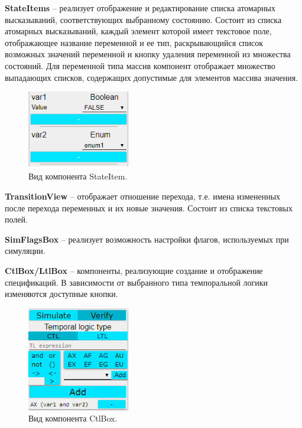\textbf{StateItems} -- реализует отображение и редактирование списка атомарных высказываний, соответствующих выбранному состоянию. Состоит из списка атомарных высказываний, каждый элемент которой имеет текстовое поле, отображающее название переменной и ее тип, раскрывающийся список возможных значений переменной и кнопку удаления переменной из множества состояний. Для переменной типа массив компонент отображает множество выпадающих списков, содержащих допустимые для элементов массива значения.


\begin{figure}[htbp]
	\centering
	\includegraphics[width=0.4\textwidth]{fig/state_item.png}
	\caption{Вид компонента StateItem.}
	\label{fig:state_item}
\end{figure}

\textbf{TransitionView} -- отображает отношение перехода, т.е. имена измененных после перехода переменных и их новые значения. Состоит из списка текстовых полей.

\textbf{SimFlagsBox} -- реализует возможность настройки флагов, используемых при симуляции.

\textbf{CtlBox/LtlBox} -- компоненты, реализующие создание и отображение спецификаций. В зависимости от выбранного типа темпоральной логики изменяются доступные кнопки.

\begin{figure}[htbp]
	\centering
	\includegraphics[width=0.4\textwidth]{fig/tl_box.png}
	\caption{Вид компонента CtlBox.}
	\label{fig:tl_box}
\end{figure}

